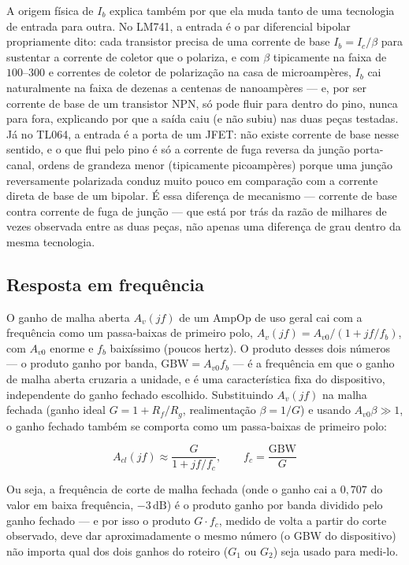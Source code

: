 \documentclass[11pt,a4paper]{article}
\begin{document}
A origem física de \(I_b\) explica também por que ela muda tanto de uma tecnologia de entrada
para outra. No LM741, a entrada é o par diferencial bipolar propriamente dito: cada transistor
precisa de uma corrente de base \(I_b=I_c/\beta\) para sustentar a corrente de coletor que o
polariza, e com \(\beta\) tipicamente na faixa de \(100\)–\(300\) e correntes de coletor de
polarização na casa de microampères, \(I_b\) cai naturalmente na faixa de dezenas a centenas de
nanoampères — e, por ser corrente de base de um transistor NPN, só pode fluir para dentro do
pino, nunca para fora, explicando por que a saída caiu (e não subiu) nas duas peças testadas. Já
no TL064, a entrada é a porta de um JFET: não existe corrente de base nesse sentido, e o que
flui pelo pino é só a corrente de fuga reversa da junção porta-canal, ordens de grandeza menor
(tipicamente picoampères) porque uma junção reversamente polarizada conduz muito pouco em
comparação com a corrente direta de base de um bipolar. É essa diferença de mecanismo — corrente
de base contra corrente de fuga de junção — que está por trás da razão de milhares de vezes
observada entre as duas peças, não apenas uma diferença de grau dentro da mesma tecnologia.

\subsection{Resposta em frequência}
\label{sec:teoria-freq}

O ganho de malha aberta \(A_v(jf)\) de um AmpOp de uso geral cai com a frequência como um
passa-baixas de primeiro polo, \(A_v(jf)=A_{v0}/(1+jf/f_b)\), com \(A_{v0}\) enorme e \(f_b\)
baixíssimo (poucos hertz). O produto desses dois números — o produto ganho por banda,
\(\text{GBW}=A_{v0}f_b\) — é a frequência em que o ganho de malha aberta cruzaria a unidade, e é
uma característica fixa do dispositivo, independente do ganho fechado escolhido. Substituindo
\(A_v(jf)\) na malha fechada (ganho ideal \(G=1+R_f/R_g\), realimentação \(\beta=1/G\)) e usando
\(A_{v0}\beta\gg1\), o ganho fechado também se comporta como um passa-baixas de primeiro polo:

\begin{equation}
A_{cl}(jf) \approx \frac{G}{1+jf/f_c}, \qquad f_c = \frac{\text{GBW}}{G}
\label{eq:corte}
\end{equation}

Ou seja, a frequência de corte de malha fechada (onde o ganho cai a \(0{,}707\) do valor em baixa
frequência, \(-3\,\text{dB}\)) é o produto ganho por banda dividido pelo ganho fechado — e por
isso o produto \(G\cdot f_c\), medido de volta a partir do corte observado, deve dar
aproximadamente o mesmo número (o GBW do dispositivo) não importa qual dos dois ganhos do
roteiro (\(G_1\) ou \(G_2\)) seja usado para medi-lo.
\end{document}
